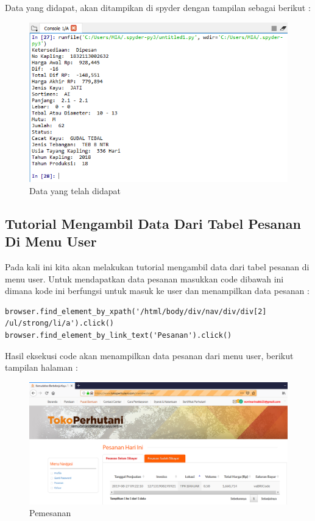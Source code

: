 Data yang didapat, akan ditampikan di spyder dengan tampilan sebagai berikut :
\begin{figure}[h]
	\centering
	\includegraphics[scale=0.6]{figures/T7_2}
	\caption{Data yang telah didapat}
\end{figure}

\subsection{Tutorial Mengambil Data Dari Tabel Pesanan Di Menu User }

Pada kali ini kita akan melakukan tutorial mengambil data dari tabel pesanan di menu user. Untuk mendapatkan data pesanan masukkan code dibawah ini dimana kode ini berfungsi untuk masuk ke user dan menampilkan data pesanan :

\begin{verbatim}
browser.find_element_by_xpath('/html/body/div/nav/div/div[2]
/ul/strong/li/a').click()
browser.find_element_by_link_text('Pesanan').click()
\end{verbatim}

Hasil eksekusi code akan menampilkan data pesanan dari menu user, berikut tampilan halaman :
\begin{figure}[h]
	\centering
	\includegraphics[scale=0.3]{figures/T8_1}
	\caption{Pemesanan}
\end{figure}


